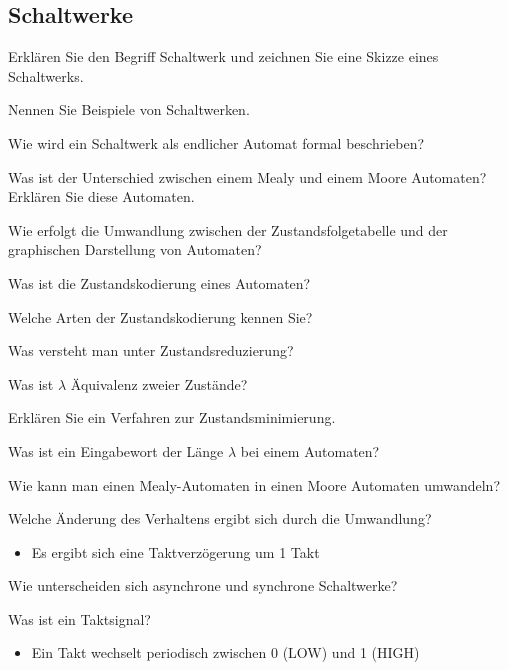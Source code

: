 \documentclass
[
  draft    = true,
  fontsize = 11pt,
  parskip  = half-,
  BCOR     = 0pt,
  DIV      = 11,
  ngerman,
  dvipsnames
]
{scrartcl}
\begin{document}
\subsection*{Schaltwerke}
\begin{mytemize}
  \item Erklären Sie den Begriff Schaltwerk und zeichnen Sie eine Skizze eines Schaltwerks.
  \item Nennen Sie Beispiele von Schaltwerken.
  \item Wie wird ein Schaltwerk als endlicher Automat formal beschrieben?
  \item Was ist der Unterschied zwischen einem Mealy und einem Moore Automaten? Erklären Sie diese Automaten.
  \item Wie erfolgt die Umwandlung zwischen der Zustandsfolgetabelle und der graphischen Darstellung von Automaten?
  \item Was ist die Zustandskodierung eines Automaten?
  \item Welche Arten der Zustandskodierung kennen Sie?
  \item Was versteht man unter Zustandsreduzierung?
  \item Was ist $\lambda$ Äquivalenz zweier Zustände?
  \item Erklären Sie ein Verfahren zur Zustandsminimierung.
  \item Was ist ein Eingabewort der Länge $\lambda$ bei einem Automaten?
  \item Wie kann man einen Mealy-Automaten in einen Moore Automaten umwandeln?
        \begin{mytemize}
          \item Welche Änderung des Verhaltens ergibt sich durch die Umwandlung?
          \begin{karsten}
          	\begin{itemize}
          		\item Es ergibt sich eine Taktverzögerung um 1 Takt
          	\end{itemize}
          \end{karsten}
        \end{mytemize}
  \item Wie unterscheiden sich asynchrone und synchrone Schaltwerke?
  \item Was ist ein Taktsignal?
	  \begin{karsten}
	  	\begin{itemize}
	  		\item Ein Takt wechselt periodisch zwischen 0 (LOW) und 1 (HIGH)

\end{itemize}
\end{karsten}
\end{mytemize}
\end{document}
